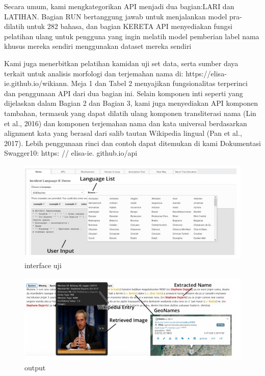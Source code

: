 \documentclass[12pt]{article}
\begin{document}
Secara umum, kami mengkategorikan API menjadi dua bagian:LARI dan LATIHAN. Bagian RUN bertanggung jawab untuk menjalankan model pra-dilatih untuk 282 bahasa, dan bagian KERETA API menyediakan fungsi pelatihan ulang untuk pengguna yang ingin melatih model pemberian label nama khusus mereka sendiri menggunakan dataset mereka sendiri

Kami juga menerbitkan pelatihan kamidan uji set data, serta sumber daya terkait untuk analisis morfologi dan terjemahan nama di: https://elisa-ie.github.io/wikiann. Meja 1 dan Tabel 2 menyajikan fungsionalitas terperinci dan penggunaan API dari dua bagian ini. Selain komponen inti seperti yang dijelaskan dalam Bagian 2 dan Bagian 3, kami juga menyediakan API komponen tambahan, termasuk yang dapat dilatih ulang komponen transliterasi nama (Lin et al., 2016) dan komponen terjemahan nama dan kata universal berdasarkan alignment kata yang berasal dari salib tautan Wikipedia lingual (Pan et al., 2017). Lebih penggunaan rinci dan contoh dapat ditemukan di kami Dokumentasi Swagger10: https: // elisa-ie. github.io/api 

\begin{figure}[ht]
\centerline{\includegraphics[width=1\textwidth]{figures/satu.JPG}}
\caption{interface uji}
\label{gambarHWI1}
\end{figure}

\begin{figure}[ht]
\centerline{\includegraphics[width=1\textwidth]{figures/dua.JPG}}
\caption{output}
\label{gambarHWI1}
\end{figure}
\end{document}
